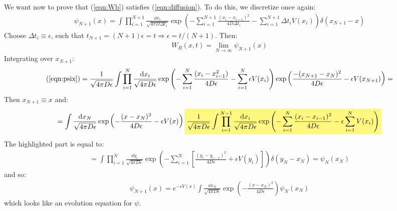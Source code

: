 \documentclass[../template.tex]{subfiles}
\begin{document}
We want now to prove that (\ref{eqn:Wb}) satisfies (\ref{eqn:diffusion}). To do this, we discretize once again:
\begin{align}
     \psi_{N+1}(x) = \int \prod_{i=1}^{N+1} \frac{\dd{x_i}}{\sqrt{4 \pi D \Delta t_i} } \exp\left(-\sum_{i=1}^{N+1} \frac{(x_i - x_{i-1})^2}{4 D \Delta t_i} - \sum_{i=1}^{N+1} \Delta t_i V(x_i)\right) \delta(x_{N+1}-x)
     \label{eqn:psix}
\end{align} 
Choose $\Delta t_i \equiv \epsilon$, such that $t_{N+1} = (N+1) \epsilon = t \Rightarrow \epsilon = t/(N+1)$. Then:
\begin{align*}
    W_B(x,t) = \lim_{N \to \infty} \psi_{N+1}(x)
\end{align*}  
Integrating over $x_{N+1}$:
\begin{align*}
    (\ref{eqn:psix}) = \frac{1}{\sqrt{4 \pi D \epsilon}}\int \prod_{i=1}^N \frac{\dd{x_i}}{\sqrt{4 \pi D \epsilon}} \exp\left(-\sum_{i=1}^N \frac{(x_i - x_{i-1}^2)}{4 D \epsilon} - \sum_{i=1}^N \epsilon V(x_i)\right) \exp\left(\frac{-(x_{N+1} - x_N)^2}{4 D \epsilon } - \epsilon V(x_{N+1}) \right) =
\end{align*} 
Then $x_{N+1} \equiv x$ and:
\begin{align*}
    = \int \frac{\dd{x_N}}{\sqrt{4 \pi D \epsilon }} \exp\left(-\frac{(x-x_N)^2}{4 D \epsilon} - \epsilon V(x) \right) \hlc{Yellow}{\frac{1}{\sqrt{4 \pi D \epsilon}}  \int \prod_{i=1}^{N-1} \frac{\dd{x_i}}{\sqrt{4 \pi D \epsilon }} \exp\left(
    -\sum_{i=1}^{N} \frac{(x_i - x_{i-1})^2}{4 D \epsilon} - \epsilon\sum_{i=1}^{N} V(x_i)    
    \right)}
\end{align*}
The highlighted part is equal to:
\begin{align*}
    = \int \prod_{i=1}^N \frac{\dd{y_i}}{\sqrt{4 \pi D \epsilon}}\exp\left(-\sum_{i=1}^N \left[\frac{(y_i - y_{i-1})^2}{4 D \epsilon} + \epsilon V(y_i)\right]\right) \delta(y_N - x_N) = \psi_N(x_N) 
\end{align*}
and so:
\begin{align*}
    \psi_{N+1}(x) = e^{-\epsilon V(x) }\int \frac{\dd{x_N}}{\sqrt{4 \pi D \epsilon }} \exp\left(-\frac{(x-x_N)^2}{4 D \epsilon} \right) \psi_N(x_N)
\end{align*}
which looks like an evolution equation for $\psi$.
\end{document}

